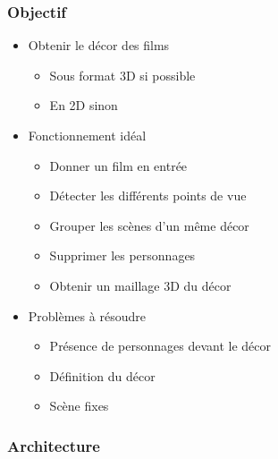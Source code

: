  \begin{frame}
   \frametitle{Objectif}
   
   \begin{itemize}
   \item Obtenir le décor des films
   	\begin{itemize}
   	\item Sous format 3D si possible
   	\item En 2D sinon
   	\end{itemize}
   	
   \item Fonctionnement idéal
   	\begin{itemize}
   	\item Donner un film en entrée
   	\item Détecter les différents points de vue
   	\item Grouper les scènes d'un même décor
   	\item Supprimer les personnages
   	\item Obtenir un maillage 3D du décor
   	\end{itemize}
   
   \item Problèmes à résoudre
  	\begin{itemize}
	\item Présence de personnages devant le décor
	\item Définition du décor
	\item Scène fixes
  	\end{itemize}

   \end{itemize}
	
 \end{frame}
 
\begin{frame}
  \frametitle{Architecture}

\end{frame}
